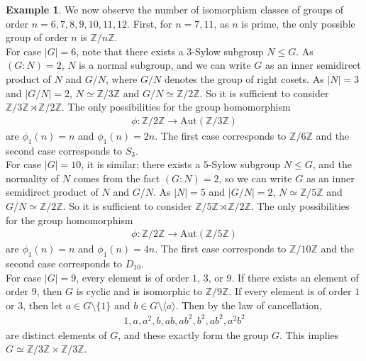 \documentclass[12pt]{report}
\theoremstyle{plain}
\theoremstyle{remark}
\theoremstyle{definition}
\newtheorem{example}[theorem]{Example}
\newcommand{\Z}{\mathbb{Z}}
\begin{document}
\begin{example}
    We now observe the number of isomorphism classes of groups of order $n=6,7,8,9,10,11,12$. First, for $n=7,11$, as $n$ is prime, the only possible group of order $n$ is $\Z/n\Z$. \\
    
    For case $|G|=6$, note that there exists a $3$-Sylow subgroup $N\le G$. As $(G:N)=2$, $N$ is a normal subgroup, and we can write $G$ as an inner semidirect product of $N$ and $G/N$, where $G/N$ denotes the group of right cosets. As $|N|=3$ and $|G/N|=2$, $N\simeq \Z/3\Z$ and $G/N\simeq \Z/2\Z$. So it is sufficient to consider $\Z/3\Z \rtimes \Z/2\Z$. The only possibilities for the group homomorphism
    \begin{align*}
        \phi:\Z/2\Z\rightarrow \mathrm{Aut}(\Z/3\Z)
    \end{align*}
    are $\phi_1(n)=n$ and $\phi_1(n)=2n$. The first case corresponds to $\Z/6\Z$ and the second case corresponds to $S_3$. \\

    For case $|G|=10$, it is similar; there exists a $5$-Sylow subgroup $N\le G$, and the normality of $N$ comes from the fact $(G:N)=2$, so we can write $G$ as an inner semidirect product of $N$ and $G/N$. As $|N|=5$ and $|G/N|=2$, $N\simeq \Z/5\Z$ and $G/N\simeq \Z/2\Z$. So it is sufficient to consider $\Z/5\Z\rtimes \Z/2\Z$. The only possibilities for the group homomorphism
    \begin{align*}
        \phi:\Z/2\Z\rightarrow \mathrm{Aut}(\Z/5\Z)
    \end{align*}
    are $\phi_1(n)=n$ and $\phi_1(n)=4n$. The first case corresponds to $\Z/10\Z$ and the second case corresponds to $D_{10}$.\\

    For case $|G|=9$, every element is of order $1$, $3$, or $9$. If there exists an element of order $9$, then $G$ is cyclic and is isomorphic to $\Z/9\Z$. If every element is of order $1$ or $3$, then let $a\in G\setminus \{1\}$ and $b\in G\setminus \langle a\rangle$. Then by the law of cancellation,
    \begin{align*}
        1,a,a^2,b,ab,ab^2,b^2,ab^2,a^2b^2
    \end{align*}
    are distinct elements of $G$, and these exactly form the group $G$. This implies $G\simeq \Z/3\Z\times\Z/3\Z$.\\


\end{example}
\end{document}
